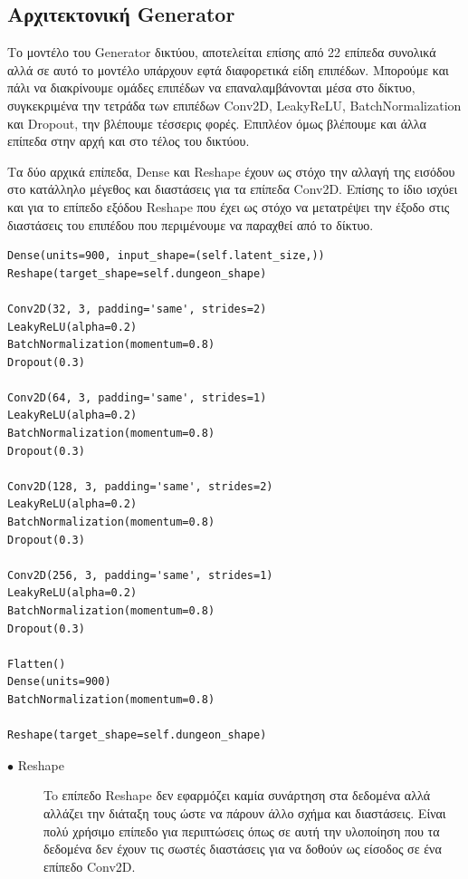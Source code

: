 \subsection{Αρχιτεκτονική Generator}
Το μοντέλο του Generator δικτύου, αποτελείται επίσης από 22 επίπεδα συνολικά αλλά σε αυτό το μοντέλο υπάρχουν εφτά διαφορετικά είδη επιπέδων. Μπορούμε και πάλι να διακρίνουμε ομάδες επιπέδων να επαναλαμβάνονται μέσα στο δίκτυο, συγκεκριμένα την τετράδα των επιπέδων  Conv2D, LeakyReLU, BatchNormalization και Dropout, την βλέπουμε τέσσερις φορές. Επιπλέον όμως βλέπουμε και άλλα επίπεδα στην αρχή και στο τέλος του δικτύου.
\par
Τα δύο αρχικά επίπεδα, Dense και Reshape έχουν ως στόχο την αλλαγή της εισόδου στο κατάλληλο μέγεθος και διαστάσεις για τα επίπεδα 
Conv2D. Επίσης το ίδιο ισχύει και για το επίπεδο εξόδου Reshape που έχει ως στόχο να μετατρέψει την έξοδο στις διαστάσεις του επιπέδου που περιμένουμε να παραχθεί από το δίκτυο.
\par

\begin{verbatim}
Dense(units=900, input_shape=(self.latent_size,))
Reshape(target_shape=self.dungeon_shape)

Conv2D(32, 3, padding='same', strides=2)
LeakyReLU(alpha=0.2)
BatchNormalization(momentum=0.8)
Dropout(0.3)

Conv2D(64, 3, padding='same', strides=1)
LeakyReLU(alpha=0.2)
BatchNormalization(momentum=0.8)
Dropout(0.3)

Conv2D(128, 3, padding='same', strides=2)
LeakyReLU(alpha=0.2)
BatchNormalization(momentum=0.8)
Dropout(0.3)

Conv2D(256, 3, padding='same', strides=1)
LeakyReLU(alpha=0.2)
BatchNormalization(momentum=0.8)
Dropout(0.3)

Flatten()
Dense(units=900)
BatchNormalization(momentum=0.8)

Reshape(target_shape=self.dungeon_shape)
\end{verbatim}

\begin{description}
\item[$\bullet$ Reshape] To επίπεδο Reshape δεν εφαρμόζει καμία συνάρτηση στα δεδομένα αλλά αλλάζει την διάταξη τους ώστε να πάρουν άλλο σχήμα και διαστάσεις. Είναι πολύ χρήσιμο επίπεδο για περιπτώσεις όπως σε αυτή την υλοποίηση που τα δεδομένα δεν έχουν τις σωστές διαστάσεις για να δοθούν ως είσοδος σε ένα επίπεδο Conv2D.
\end{description}

